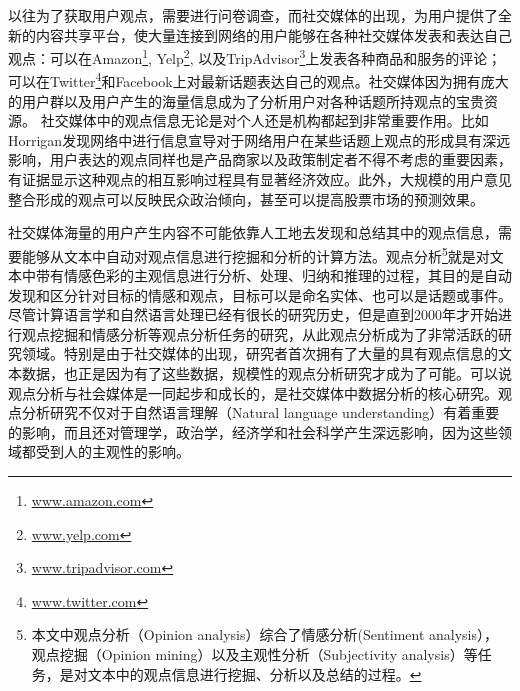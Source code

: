 以往为了获取用户观点，需要进行问卷调查，而社交媒体的出现，为用户提供了全新的内容共享平台，使大量连接到网络的用户能够在各种社交媒体发表和表达自己观点：可以在Amazon\footnote{\url{www.amazon.com}}, Yelp\footnote{\url{www.yelp.com}}, 以及TripAdvisor\footnote{\url{www.tripadvisor.com}}上发表各种商品和服务的评论；可以在Twitter\footnote{\url{www.twitter.com}}和Facebook上对最新话题表达自己的观点。社交媒体因为拥有庞大的用户群以及用户产生的海量信息成为了分析用户对各种话题所持观点的宝贵资源。
社交媒体中的观点信息无论是对个人还是机构都起到非常重要作用。比如Horrigan发现网络中进行信息宣导对于网络用户在某些话题上观点的形成具有深远影响，用户表达的观点同样也是产品商家以及政策制定者不得不考虑的重要因素，有证据显示这种观点的相互影响过程具有显著经济效应。此外，大规模的用户意见整合形成的观点可以反映民众政治倾向，甚至可以提高股票市场的预测效果。

社交媒体海量的用户产生内容不可能依靠人工地去发现和总结其中的观点信息，需要能够从文本中自动对观点信息进行挖掘和分析的计算方法。观点分析\footnote{本文中观点分析（Opinion analysis）综合了情感分析(Sentiment analysis），观点挖掘（Opinion mining）以及主观性分析（Subjectivity analysis）等任务，是对文本中的观点信息进行挖掘、分析以及总结的过程。}就是对文本中带有情感色彩的主观信息进行分析、处理、归纳和推理的过程，其目的是自动发现和区分针对目标的情感和观点，目标可以是命名实体、也可以是话题或事件。
尽管计算语言学和自然语言处理已经有很长的研究历史，但是直到2000年才开始进行观点挖掘和情感分析等观点分析任务的研究，从此观点分析成为了非常活跃的研究领域。特别是由于社交媒体的出现，研究者首次拥有了大量的具有观点信息的文本数据，也正是因为有了这些数据，规模性的观点分析研究才成为了可能。可以说观点分析与社会媒体是一同起步和成长的，是社交媒体中数据分析的核心研究。观点分析研究不仅对于自然语言理解（Natural language understanding）有着重要的影响，而且还对管理学，政治学，经济学和社会科学产生深远影响，因为这些领域都受到人的主观性的影响。

%
%

